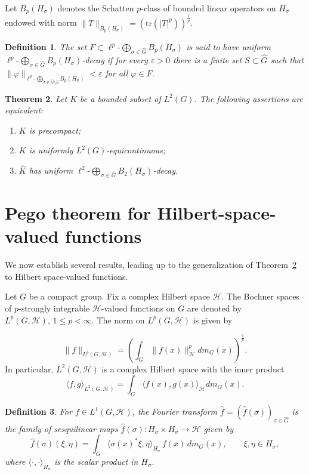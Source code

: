 \documentclass[11pt]{amsart}
\newtheorem{theorem}{Theorem}[section]
\newtheorem{definition}[theorem]{Definition}
\def\petitoplus{\mathop{\bigoplus}}
\begin{document}
Let $B_p(H_\sigma)$ denotes   the Schatten $p$-class of bounded linear operators on $H_\sigma$ endowed with norm  $\|T\|_{B_p(H_\sigma)}=\left(\text{tr}(|T|^p)\right)^{\frac{1}{p}}$.

\begin{definition}
The set $F\subset\ell^p\text{-}\petitoplus\limits_{\sigma\in \widehat{G}} B_p(H_\sigma)$ is said to have uniform
$\ell^p\text{-}\petitoplus\limits_{\sigma\in \widehat{G}} B_p(H_\sigma)$-decay if for every $\varepsilon>0$ there
is a finite set $S\subset\widehat{G}$ such that  $\|\varphi\|_{\ell^p\text{-}\petitoplus_{\sigma \in \widehat{G}\setminus S}B_p(H_\sigma)}<\varepsilon$ for all $\varphi\in F$. 

\end{definition}

\begin{theorem} \cite[Theorem 1.1]{Kumar2024}\label{thm:kumar}
Let $K$ be a bounded subset of $L^2(G)$. The following assertions are equivalent:
\begin{enumerate}
\item[(i)] $K$
is precompact;
\item[(ii)] $K$ is uniformly $L^2(G)$-equicontinuous;
\item[(iii)] $\widehat K$ has uniform $\ell^2\text{-}\petitoplus\limits_{\sigma \in \widehat{G}} B_2(H_\sigma)$-decay.
\end{enumerate}
\end{theorem}
\section{Pego theorem for Hilbert-space-valued functions}\label{sec: main results}
We now establish several results, leading up to the generalization of  Theorem~\ref{thm:kumar} to Hilbert space-valued functions.


 Let $G$ be a compact group. Fix a  complex Hilbert space $\mathcal{H}$. The Bochner spaces of $p$-strongly integrable $\mathcal{H}$-valued functions on $G$ are denoted by $L^p(G,\mathcal{H}), \, 1\le p<\infty$. The norm on $L^p(G,\mathcal{H})$ is given by 
 
$$ \|f\|_{L^p(G,\mathcal{H})}=\left(\int_G\|f(x)\|_{\mathcal{H}}^pdm_G(x)\right)^{\frac{1}{p}}.$$
In particular, $L^2(G,\mathcal{H})$ is a complex  Hilbert space with the inner product
$$\langle f,g\rangle_{L^2(G,\mathcal{H})}=\int_G\langle f(x),g(x)\rangle_{\mathcal{H}}dm_G(x).$$
\begin{definition}\cite{Assiamoua1989}
For $f\in L^1(G,\mathcal{H})$, the Fourier transform  $\widehat f=(\widehat f(\sigma))_{\sigma\in\widehat{G}}$
is the family of sesquilinear maps $\widehat f(\sigma):H_\sigma\times H_\sigma\to\mathcal{H}$ given by 
\[
\widehat f(\sigma)(\xi,\eta)=\int_G\langle\sigma(x)^*\xi,\eta\rangle_{H_\sigma}\,f(x)\,dm_G(x),
\qquad\xi,\eta\in H_\sigma,
\]
where $\langle \cdot, \cdot\rangle_{H_\sigma}$ is the scalar product in $H_\sigma$.
\end{definition}
\end{document}
